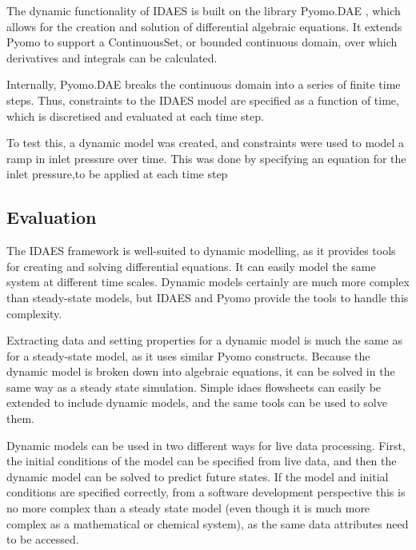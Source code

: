 \documentclass[12pt]{article}
\begin{document}

The dynamic functionality of IDAES is built on the library Pyomo.DAE \cite{nicholson2018pyomo}, which allows for the creation and solution of differential algebraic equations. It extends Pyomo to support a ContinuousSet, or bounded continuous domain, over which derivatives and integrals can be calculated. 

Internally, Pyomo.DAE breaks the continuous domain into a series of finite time steps. Thus, constraints to the IDAES model are specified as a function of time, which is discretised and evaluated at each time step.

To test this, a dynamic model was created, and constraints were used to model a ramp in inlet pressure over time. This was done by specifying an equation for the inlet pressure,to be applied at each time step

\subsection{Evaluation}
The IDAES framework is well-suited to dynamic modelling, as it provides tools for creating and solving differential equations. It can easily model the same system at different time scales. Dynamic models certainly are much more complex than steady-state models, but IDAES and Pyomo provide the tools to handle this complexity.

Extracting data and setting properties for a dynamic model is much the same as for a steady-state model, as it uses similar Pyomo constructs. Because the dynamic model is broken down into algebraic equations, it can be solved in the same way as a steady state simulation. Simple idaes flowsheets can easily be extended to include dynamic models, and the same tools can be used to solve them. 

Dynamic models can be used in two different ways for live data processing. First, the initial conditions of the model can be specified from live data, and then the dynamic model can be solved to predict future states. If the model and initial conditions are specified correctly, from a software development perspective this is no more complex than a steady state model (even though it is much more complex as a mathematical or chemical system), as the same data attributes need to be accessed. 
\end{document}
